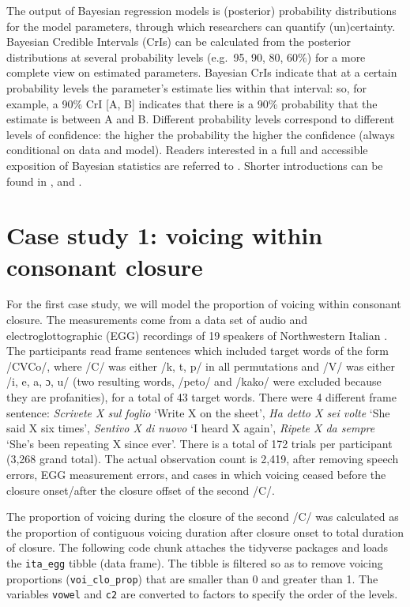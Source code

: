\documentclass[
  authoryear,
  preprint,
  3p]{elsarticle}
\begin{document}
The output of Bayesian regression models is (posterior) probability
distributions for the model parameters, through which researchers can
quantify (un)certainty. Bayesian Credible Intervals (CrIs) can be
calculated from the posterior distributions at several probability
levels (e.g.~95, 90, 80, 60\%) for a more complete view on estimated
parameters. Bayesian CrIs indicate that at a certain probability levels
the parameter's estimate lies within that interval: so, for example, a
90\% CrI {[}A, B{]} indicates that there is a 90\% probability that the
estimate is between A and B. Different probability levels correspond to
different levels of confidence: the higher the probability the higher
the confidence (always conditional on data and model). Readers
interested in a full and accessible exposition of Bayesian statistics
are referred to \citet{mcelreath2019}. Shorter introductions can be
found in \citet{etz2018}, \citet{vasishth2018} and
\citet{nalborczyk2019}.

\section{Case study 1: voicing within consonant
closure}\label{sec-case-1}

For the first case study, we will model the proportion of voicing within
consonant closure. The measurements come from a data set of audio and
electroglottographic (EGG) recordings of 19 speakers of Northwestern
Italian \citep{coretta2019k, coretta2020b}. The participants read frame
sentences which included target words of the form /CVCo/, where /C/ was
either /k, t, p/ in all permutations and /V/ was either /i, e, a, ɔ, u/
(two resulting words, /peto/ and /kako/ were excluded because they are
profanities), for a total of 43 target words. There were 4 different
frame sentence: \emph{Scrivete X sul foglio} `Write X on the sheet',
\emph{Ha detto X sei volte} `She said X six times', \emph{Sentivo X di
nuovo} `I heard X again', \emph{Ripete X da sempre} `She's been
repeating X since ever'. There is a total of 172 trials per participant
(3,268 grand total). The actual observation count is 2,419, after
removing speech errors, EGG measurement errors, and cases in which
voicing ceased before the closure onset/after the closure offset of the
second /C/.

The proportion of voicing during the closure of the second /C/ was
calculated as the proportion of contiguous voicing duration after
closure onset to total duration of closure. The following code chunk
attaches the tidyverse packages \citep[for reading and wrangling
data,][]{wickham2019} and loads the \texttt{ita\_egg} tibble (data
frame). The tibble is filtered so as to remove voicing proportions
(\texttt{voi\_clo\_prop}) that are smaller than 0 and greater than 1.
The variables \texttt{vowel} and \texttt{c2} are converted to factors to
specify the order of the levels.
\end{document}
